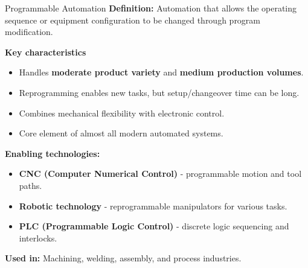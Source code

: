 \begin{frame}{Programmable Automation}
\textbf{Definition:}  
Automation that allows the operating sequence or equipment configuration to be changed through program modification.

\vspace{2mm}
\textbf{Key characteristics}
\begin{itemize}
  \item Handles \textbf{moderate product variety} and \textbf{medium production volumes}.
  \item Reprogramming enables new tasks, but setup/changeover time can be long.
  \item Combines mechanical flexibility with electronic control.
  \item Core element of almost all modern automated systems.
\end{itemize}

\vspace{3mm}
\textbf{Enabling technologies:}
\begin{itemize}
  \item \textbf{CNC (Computer Numerical Control)} - programmable motion and tool paths.
  \item \textbf{Robotic technology} - reprogrammable manipulators for various tasks.
  \item \textbf{PLC (Programmable Logic Control)} - discrete logic sequencing and interlocks.
\end{itemize}

\vspace{3mm}
\textbf{Used in:} Machining, welding, assembly, and process industries.
\end{frame}

